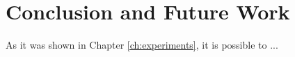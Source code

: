 \chapter{Conclusion and Future Work}
\label{ch:conclusion}

As it was shown in Chapter \ref{ch:experiments}, it is possible to ...